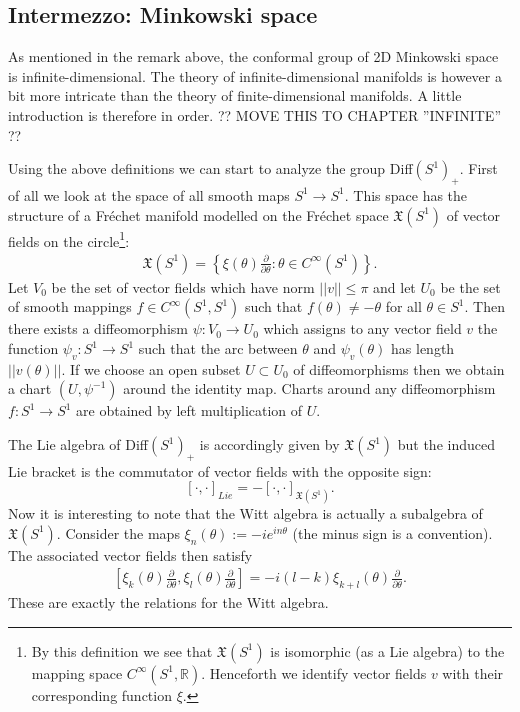 \subsection{Intermezzo: Minkowski space}

    As mentioned in the remark above, the conformal group of 2D Minkowski space is infinite-dimensional. The theory of infinite-dimensional manifolds is however a bit more intricate than the theory of finite-dimensional manifolds. A little introduction is therefore in order. ?? MOVE THIS TO CHAPTER ''INFINITE'' ??


    Using the above definitions we can start to analyze the group Diff$(S^1)_+$. First of all we look at the space of all smooth maps $S^1\rightarrow S^1$. This space has the structure of a Fr\'echet manifold modelled on the Fr\'echet space $\mathfrak{X}(S^1)$ of vector fields on the circle\footnote{By this definition we see that $\mathfrak{X}(S^1)$ is isomorphic (as a Lie algebra) to the mapping space $C^\infty(S^1, \mathbb{R})$. Henceforth we identify vector fields $v$ with their corresponding function $\xi$.}:
    \begin{gather}
        \mathfrak{X}(S^1) = \left\{\xi(\theta)\frac{\partial}{\partial\theta}:\theta\in C^\infty(S^1)\right\}.
    \end{gather}
    Let $V_0$ be the set of vector fields which have norm $||v||\leq\pi$ and let $U_0$ be the set of smooth mappings $f\in C^\infty(S^1, S^1)$ such that $f(\theta)\neq-\theta$ for all $\theta\in S^1$. Then there exists a diffeomorphism $\psi:V_0\rightarrow U_0$ which assigns to any vector field $v$ the function $\psi_v:S^1\rightarrow S^1$ such that the arc between $\theta$ and $\psi_v(\theta)$ has length $||v(\theta)||$. If we choose an open subset $U\subset U_0$ of diffeomorphisms then we obtain a chart $(U, \psi^{-1})$ around the identity map. Charts around any diffeomorphism $f:S^1\rightarrow S^1$ are obtained by left multiplication of $U$.

    The Lie algebra of Diff$(S^1)_+$ is accordingly given by $\mathfrak{X}(S^1)$ but the induced Lie bracket is the commutator of vector fields with the opposite sign: \[[\cdot, \cdot]_{Lie} = -[\cdot, \cdot]_{\mathfrak{X}(S^1)}.\] Now it is interesting to note that the Witt algebra is actually a subalgebra of $\mathfrak{X}(S^1)$. Consider the maps $\xi_n(\theta):=-ie^{in\theta}$ (the minus sign is a convention). The associated vector fields then satisfy
    \begin{gather}
        \left[\xi_k(\theta)\frac{\partial}{\partial\theta}, \xi_l(\theta)\frac{\partial}{\partial\theta}\right] = -i(l-k)\xi_{k+l}(\theta)\frac{\partial}{\partial\theta}.
    \end{gather}
    These are exactly the relations for the Witt algebra.

